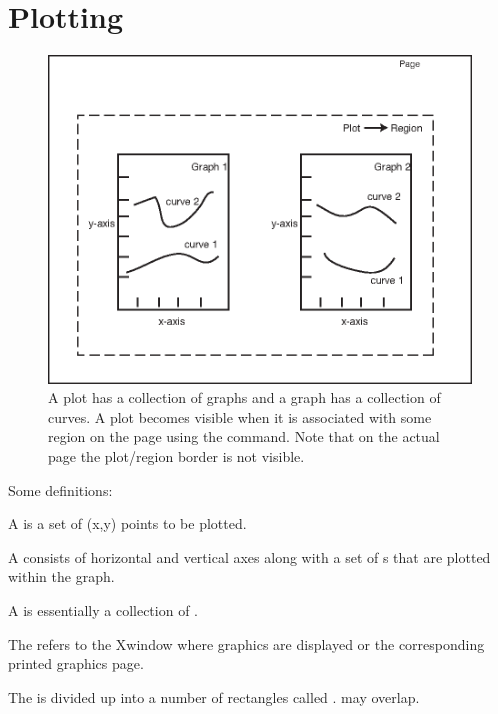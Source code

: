 \section{Plotting}
\label{s:plotting}

\begin{figure}[tb]
  \centering
  \includegraphics{plot.eps}
  \caption[A plot has a collection of graphs.]
{A plot has a collection of graphs and a graph has a 
collection of curves. A plot becomes visible when it is associated
with some region on the page using the  command. Note that
on the actual page the plot/region border is not visible.}
  \label{f:plot}
\end{figure}

Some definitions:
  \vspace*{-3ex}
\begin{description}
\item[Curve] \Newline
A  is a set of (x,y) points to be plotted.
\item[Graph] \Newline
A  consists of horizontal and vertical axes along with a set
of s that are plotted within the graph. 
\item[Plot] \Newline
A  is essentially a collection of .
\item[Page] \Newline
The  refers to the Xwindow where graphics are displayed or the 
corresponding printed graphics page.
\item[Region] \Newline
The  is divided up into a number of rectangles called
.  may overlap.
\end{description}

